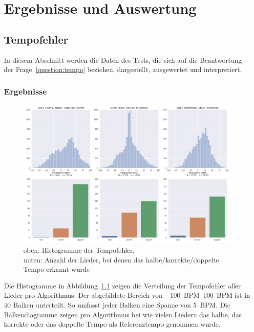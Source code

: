 \chapter{Ergebnisse und Auswertung}
\label{ergebnisse}
\acresetall


\section{Tempofehler}
{
	In diesem Abschnitt werden die Daten des Tests,
		die sich auf die Beantwortung der Frage~\ref{question:tempo} beziehen,
		dargestellt, ausgewertet und interpretiert.

	\subsection{Ergebnisse}
	{
		\begin{figure}[h]
			\hspace{-17mm}
			\includegraphics[scale=0.4]{resources/tempo_error_histogram.png}
			\caption{
				oben: Histogramme der Tempofehler, \\
				unten: Anzahl der Lieder, bei denen das halbe/korrekte/doppelte Tempo erkannt wurde
			}
			\label{fig:tempoerror}
		\end{figure}

		Die Histogramme in Abbildung~\ref{fig:tempoerror} zeigen die Verteilung der Tempofehler aller Lieder pro Algorithmus.
		Der abgebildete Bereich von \SIrange{-100}{100}{\ac{BPM}} ist in \num{40} Balken unterteilt.
		So umfasst jeder Balken eine Spanne von \SI{5}{\ac{BPM}}.
		Die Balkendiagramme zeigen pro Algorithmus
			bei wie vielen Liedern das halbe, das korrekte oder das doppelte Tempo als Referenztempo genommen wurde.

}}

